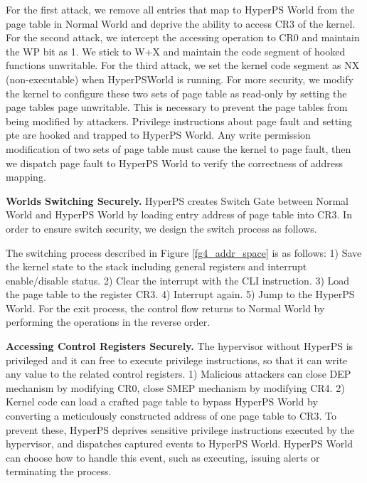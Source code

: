 \documentclass[10pt, numbers, preprint ]{sigplanconf}
\begin{document}
{For the first attack, we remove all entries that map to HyperPS World from the page table in Normal World and deprive the ability to access CR3 of the kernel. For the second attack, we intercept the accessing operation to CR0 and maintain the WP bit as 1. We stick to W+X and maintain the code segment of hooked functions unwritable. For the third attack, we set the kernel code segment as NX (non-executable) when HyperPSWorld is running. For more security, we modify the kernel to configure these two sets of page table as read-only by setting the page tables page unwritable. This is necessary to prevent the page tables from being modified by attackers. Privilege instructions about page fault and setting pte are hooked and trapped to HyperPS World. Any write permission modification of two sets of page table must cause the kernel to page fault, then we dispatch page fault to HyperPS World to verify the correctness of address mapping.

\textbf{Worlds Switching Securely.} HyperPS creates Switch Gate between Normal World and HyperPS World by loading entry address of page table into CR3. In order to ensure switch security, we design the switch process as follows.

The switching process described in Figure \ref{fg4_addr_space} is as follows: 1) Save the kernel state to the stack including general registers and interrupt enable/disable status. 2) Clear the interrupt with the CLI instruction. 3) Load the page table to the register CR3. 4) Interrupt again. 5) Jump to the HyperPS World. For the exit process, the control flow returns to Normal World by performing the operations in the reverse order.

\textbf{Accessing Control Registers Securely.} The hypervisor without HyperPS is privileged and it can free to execute privilege instructions, so that it can write any value to the related control registers. 1) Malicious attackers can close DEP mechanism by modifying CR0, close SMEP mechanism by modifying CR4. 2) Kernel code can load a crafted page table to bypass HyperPS World by converting a meticulously constructed address of one page table to CR3. To prevent these, HyperPS deprives sensitive privilege instructions executed by the hypervisor, and dispatches captured events to HyperPS World. HyperPS World can choose how to handle this event, such as executing, issuing alerts or terminating the process.

}
\end{document}

